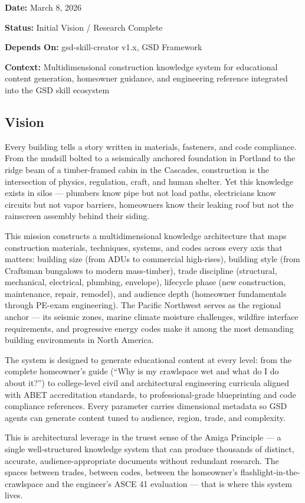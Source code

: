 \documentclass[11pt,letterpaper]{article}
\newcommand{\metafield}[2]{\textbf{\sffamily #1} #2\par}
\begin{document}
\metafield{Date:}{March 8, 2026}
\metafield{Status:}{Initial Vision / Research Complete}
\metafield{Depends On:}{gsd-skill-creator v1.x, GSD Framework}
\metafield{Context:}{Multidimensional construction knowledge system for educational content generation, homeowner guidance, and engineering reference integrated into the GSD skill ecosystem}

\subsection{Vision}

Every building tells a story written in materials, fasteners, and code compliance. From the mudsill bolted to a seismically anchored foundation in Portland to the ridge beam of a timber-framed cabin in the Cascades, construction is the intersection of physics, regulation, craft, and human shelter. Yet this knowledge exists in silos --- plumbers know pipe but not load paths, electricians know circuits but not vapor barriers, homeowners know their leaking roof but not the rainscreen assembly behind their siding.

This mission constructs a multidimensional knowledge architecture that maps construction materials, techniques, systems, and codes across every axis that matters: building size (from ADUs to commercial high-rises), building style (from Craftsman bungalows to modern mass-timber), trade discipline (structural, mechanical, electrical, plumbing, envelope), lifecycle phase (new construction, maintenance, repair, remodel), and audience depth (homeowner fundamentals through PE-exam engineering). The Pacific Northwest serves as the regional anchor --- its seismic zones, marine climate moisture challenges, wildfire interface requirements, and progressive energy codes make it among the most demanding building environments in North America.

The system is designed to generate educational content at every level: from the complete homeowner's guide (``Why is my crawlspace wet and what do I do about it?'') to college-level civil and architectural engineering curricula aligned with ABET accreditation standards, to professional-grade blueprinting and code compliance references. Every parameter carries dimensional metadata so GSD agents can generate content tuned to audience, region, trade, and complexity.

This is architectural leverage in the truest sense of the Amiga Principle --- a single well-structured knowledge system that can produce thousands of distinct, accurate, audience-appropriate documents without redundant research. The spaces between trades, between codes, between the homeowner's flashlight-in-the-crawlspace and the engineer's ASCE 41 evaluation --- that is where this system lives.
\end{document}

